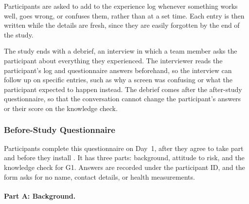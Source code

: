 \documentclass[12pt, titlepage]{article}
\begin{document}
Participants are asked to add to the experience log whenever something works
well, goes wrong, or confuses them, rather than at a set time. Each entry is
then written while the details are fresh, since they are easily forgotten by
the end of the study.

The study ends with a debrief, an interview in which a team member asks the
participant about everything they experienced. The interviewer reads the
participant's log and questionnaire answers beforehand, so the interview can
follow up on specific entries, such as why a screen was confusing or what the
participant expected to happen instead. The debrief comes after the
after-study questionnaire, so that the conversation cannot change the
participant's answers or their score on the knowledge check.

\subsubsection{Before-Study Questionnaire} \label{SecBeforeStudy}

Participants complete this questionnaire on Day~1, after they agree to take
part and before they install \progname{}. It has three parts: background,
attitude to risk, and the knowledge check for G1. Answers are recorded under
the participant ID, and the form asks for no name, contact details, or health
measurements.

\paragraph{Part A: Background.}
\end{document}

